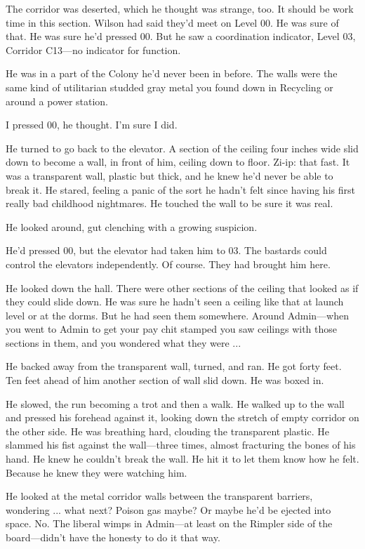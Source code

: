 The corridor was deserted, which he thought was strange, too. It should be work time in this section. Wilson had said they'd meet on Level 00. He was sure of that. He was sure he'd pressed 00. But he saw a coordination indicator, Level 03, Corridor C13—no indicator for function.

He was in a part of the Colony he'd never been in before. The walls were the same kind of utilitarian studded gray metal you found down in Recycling or around a power station.

I pressed 00, he thought. I'm sure I did.

He turned to go back to the elevator. A section of the ceiling four inches wide slid down to become a wall, in front of him, ceiling down to floor. Zi-ip: that fast. It was a transparent wall, plastic but thick, and he knew he'd never be able to break it. He stared, feeling a panic of the sort he hadn't felt since having his first really bad childhood nightmares. He touched the wall to be sure it was real.

He looked around, gut clenching with a growing suspicion.

He'd pressed 00, but the elevator had taken him to 03. The bastards could control the elevators independently. Of course. They had brought him here.

He looked down the hall. There were other sections of the ceiling that looked as if they could slide down. He was sure he hadn't seen a ceiling like that at launch level or at the dorms. But he had seen them somewhere. Around Admin—when you went to Admin to get your pay chit stamped you saw ceilings with those sections in them, and you wondered what they were ...

He backed away from the transparent wall, turned, and ran. He got forty feet. Ten feet ahead of him another section of wall slid down. He was boxed in.

He slowed, the run becoming a trot and then a walk. He walked up to the wall and pressed his forehead against it, looking down the stretch of empty corridor on the other side. He was breathing hard, clouding the transparent plastic. He slammed his fist against the wall—three times, almost fracturing the bones of his hand. He knew he couldn't break the wall. He hit it to let them know how he felt. Because he knew they were watching him.

He looked at the metal corridor walls between the transparent barriers, wondering ... what next? Poison gas maybe? Or maybe he'd be ejected into space. No. The liberal wimps in Admin—at least on the Rimpler side of the board—didn't have the honesty to do it that way.

